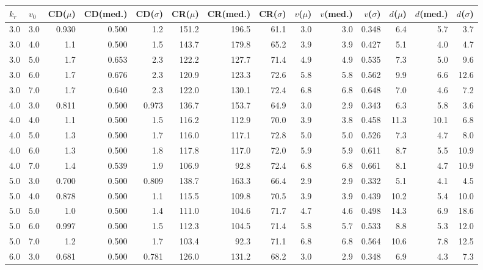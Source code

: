 \renewcommand{\arraystretch}{1.0}
\setlength{\tabcolsep}{4pt}
\begin{table}[htbp]
\centering
\scriptsize

\begin{tabularx}{\textwidth}{llrrrrrrrrrrrr}
\toprule
$k_r$ & $v_0$ & CD($\mu$) & CD(med.) & CD($\sigma$) & CR($\mu$) & CR(med.) & CR($\sigma$) & $v$($\mu$) & $v$(med.) & $v$($\sigma$) & $d$($\mu$) & $d$(med.) & $d$($\sigma$) \\
\midrule
3.0 & 3.0 & 0.930 & 0.500 & 1.2 & 151.2 & 196.5 & 61.1 & 3.0 & 3.0 & 0.348 & 6.4 & 5.7 & 3.7 \\
3.0 & 4.0 & 1.1 & 0.500 & 1.5 & 143.7 & 179.8 & 65.2 & 3.9 & 3.9 & 0.427 & 5.1 & 4.0 & 4.7 \\
3.0 & 5.0 & 1.7 & 0.653 & 2.3 & 122.2 & 127.7 & 71.4 & 4.9 & 4.9 & 0.535 & 7.3 & 5.0 & 9.6 \\
3.0 & 6.0 & 1.7 & 0.676 & 2.3 & 120.9 & 123.3 & 72.6 & 5.8 & 5.8 & 0.562 & 9.9 & 6.6 & 12.6 \\
3.0 & 7.0 & 1.7 & 0.640 & 2.3 & 122.0 & 130.1 & 72.4 & 6.8 & 6.8 & 0.648 & 7.0 & 4.6 & 7.2 \\
4.0 & 3.0 & 0.811 & 0.500 & 0.973 & 136.7 & 153.7 & 64.9 & 3.0 & 2.9 & 0.343 & 6.3 & 5.8 & 3.6 \\
4.0 & 4.0 & 1.1 & 0.500 & 1.5 & 116.2 & 112.9 & 70.0 & 3.9 & 3.8 & 0.458 & 11.3 & 10.1 & 6.8 \\
4.0 & 5.0 & 1.3 & 0.500 & 1.7 & 116.0 & 117.1 & 72.8 & 5.0 & 5.0 & 0.526 & 7.3 & 4.7 & 8.0 \\
4.0 & 6.0 & 1.3 & 0.500 & 1.8 & 117.8 & 117.0 & 72.0 & 5.9 & 5.9 & 0.611 & 8.7 & 5.5 & 10.9 \\
4.0 & 7.0 & 1.4 & 0.539 & 1.9 & 106.9 & 92.8 & 72.4 & 6.8 & 6.8 & 0.661 & 8.1 & 4.7 & 10.9 \\
5.0 & 3.0 & 0.700 & 0.500 & 0.809 & 138.7 & 163.3 & 66.4 & 2.9 & 2.9 & 0.332 & 5.1 & 4.1 & 4.5 \\
5.0 & 4.0 & 0.878 & 0.500 & 1.1 & 115.5 & 109.8 & 70.5 & 3.9 & 3.9 & 0.439 & 10.2 & 5.4 & 10.0 \\
5.0 & 5.0 & 1.0 & 0.500 & 1.4 & 111.0 & 104.6 & 71.7 & 4.7 & 4.6 & 0.498 & 14.3 & 6.9 & 18.6 \\
5.0 & 6.0 & 0.997 & 0.500 & 1.5 & 112.3 & 104.5 & 71.4 & 5.8 & 5.7 & 0.533 & 8.8 & 5.3 & 12.0 \\
5.0 & 7.0 & 1.2 & 0.500 & 1.7 & 103.4 & 92.3 & 71.1 & 6.8 & 6.8 & 0.564 & 10.6 & 7.8 & 12.5 \\
6.0 & 3.0 & 0.681 & 0.500 & 0.781 & 126.0 & 131.2 & 68.2 & 3.0 & 2.9 & 0.348 & 6.9 & 4.3 & 7.3 \\

\end{tabularx}
\end{table}
